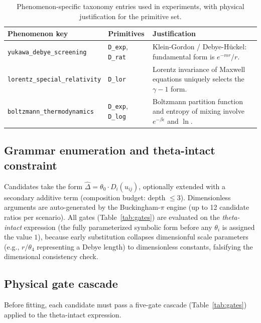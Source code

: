 \documentclass{article}
\begin{document}
\begin{table}[ht]
\small
\caption{Phenomenon-specific taxonomy entries used in experiments,
with physical justification for the primitive set.}
\label{tab:taxonomy}
\centering
\begin{tabular}{@{}p{4.3cm}p{2.0cm}p{6.5cm}@{}}
\toprule
Phenomenon key & Primitives & Justification \\
\midrule
\texttt{yukawa\_debye\_screening} & \texttt{D\_exp}, \texttt{D\_rat} &
  Klein-Gordon / Debye-H\"{u}ckel: fundamental form is $e^{-mr}/r$. \\
\texttt{lorentz\_special\_relativity} & \texttt{D\_lor} &
  Lorentz invariance of Maxwell equations uniquely selects the $\gamma-1$ form. \\
\texttt{boltzmann\_thermodynamics} & \texttt{D\_exp}, \texttt{D\_log} &
  Boltzmann partition function and entropy of mixing involve $e^{-\beta\epsilon}$ and $\ln$. \\
\bottomrule
\end{tabular}
\end{table}

\subsection{Grammar enumeration and theta-intact constraint}

Candidates take the form $\hat{\Delta}=\theta_0\cdot D_i(u_{ij})$, optionally
extended with a secondary additive term (composition budget: depth $\le3$).
Dimensionless arguments are auto-generated by the Buckingham-$\pi$ engine
(up to 12 candidate ratios per scenario).
All gates (Table~\ref{tab:gates}) are evaluated on the \emph{theta-intact}
expression (the fully parameterized symbolic form before any $\theta_i$ is
assigned the value $1$), because early substitution collapses dimensionful scale
parameters (e.g., $r/\theta_4$ representing a Debye length) to dimensionless
constants, falsifying the dimensional consistency check.

\subsection{Physical gate cascade}
\label{sec:gates}

Before fitting, each candidate must pass a five-gate cascade
(Table~\ref{tab:gates}) applied to the theta-intact expression.
\end{document}
